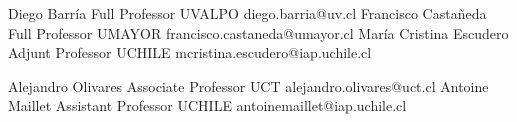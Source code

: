 





\begin{referees}
		{Diego Barría}
		{Full Professor}
		{UVALPO}
		{diego.barria@uv.cl}
		{Francisco Castañeda}
		{Full Professor}
		{UMAYOR}
		{francisco.castaneda@umayor.cl}
		{María Cristina Escudero}
		{Adjunt Professor}
		{UCHILE}
		{mcristina.escudero@iap.uchile.cl}
\end{referees}

\begin{referees}
		{Alejandro Olivares}
		{Associate Professor}
		{UCT}
		{alejandro.olivares@uct.cl}
		{Antoine Maillet}
		{Assistant Professor}
		{UCHILE}
		{antoinemaillet@iap.uchile.cl}
\end{referees}
